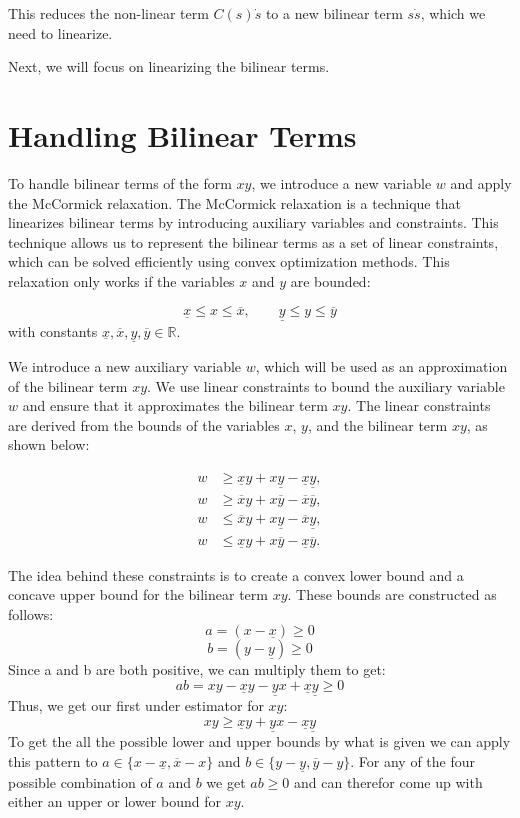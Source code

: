 This reduces the non-linear term \(C(s)\dot{s}\) to a new bilinear term \(s\dot{s}\), which we need to linearize.

Next, we will focus on linearizing the bilinear terms.

\section{Handling Bilinear Terms}

To handle bilinear terms of the form \(xy\), we introduce a new variable \(w\) and apply the McCormick relaxation.
The McCormick relaxation is a technique that linearizes bilinear terms by introducing auxiliary variables and constraints.
This technique allows us to represent the bilinear terms as a set of linear constraints, which can be solved efficiently using convex optimization
methods.
This relaxation only works if the variables \(x\) and \(y\) are bounded:

\[ \underline{x} \leq x \leq \overline{x}, \qquad
	\underline{y} \leq y \leq \overline{y} \] with constants \(\underline{x}, \overline{x}, \underline{y}, \overline{y} \in \mathbb{R}\).

We introduce a new auxiliary variable \(w\), which will be used as an approximation of the bilinear term \(xy\).
We use linear constraints to bound the auxiliary variable \(w\) and ensure that it approximates the bilinear term \(xy\).
The linear constraints are derived from the bounds of the variables \(x\), \(y\), and the bilinear term \(xy\), as shown below:

\[
	\begin{aligned}
		w & \geq \underline{x} y + x \underline{y} - \underline{x} \underline{y}, \\
		w & \geq \overline{x} y + x \overline{y} - \overline{x} \overline{y},     \\
		w & \leq \overline{x} y + x \underline{y} - \overline{x} \underline{y},   \\
		w & \leq \underline{x} y + x \overline{y} - \underline{x} \overline{y}.
	\end{aligned}
\]

The idea behind these constraints is to create a convex lower bound and a concave upper bound for the bilinear term \(xy\).
These bounds are constructed as follows: \[ a = (x - \underline{x}) \geq 0 \] \[ b = (y - \underline{y}) \geq 0 \] Since a and b are both positive,
we can multiply them to get: \[ ab = xy - \underline{x}y - \underline{y}x + \underline{x}\underline{y} \geq 0 \] Thus, we get our first under
estimator for $xy$: \[ xy \geq \underline{x}y + \underline{y}x - \underline{x}\underline{y} \] To get the all the possible lower and upper bounds by
what is given we can apply this pattern to $a\in\{x - \underline{x}, \overline{x} - x\}$ and $b\in\{y - \underline{y}, \overline{y} - y\}$.
For any of the four possible combination of $a$ and $b$ we get $ab\geq0$ and can therefor come up with either an upper or lower bound for $xy$.

